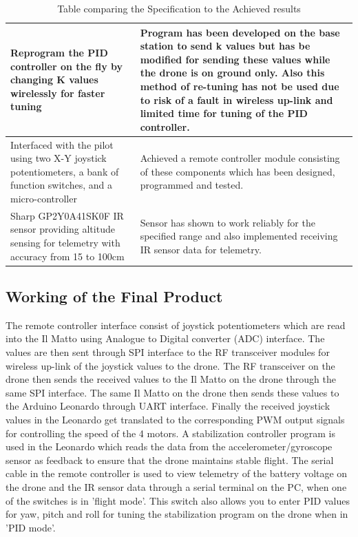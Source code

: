 \documentclass[a4paper,11pt]{article}
\begin{document}
\begin{center}
\begin{table}[!htp]
\begin{tabular}{|m{5cm}|m{8cm}|}
    \hline
    Reprogram the PID controller on the fly by changing K values wirelessly for faster tuning & Program has been developed on the base station to send k values but has be modified for sending these values while the drone is on ground only. Also this method of re-tuning has not be used due to risk of a fault in wireless up-link and limited time for tuning of the PID controller.\\
    \hline
    Interfaced with the pilot using two X-Y joystick potentiometers, a bank of function switches, and a micro-controller & Achieved a remote controller module consisting of these components which has been designed, programmed and tested.\\
    \hline 
    Sharp GP2Y0A41SK0F IR sensor providing altitude sensing for telemetry with accuracy from 15 to 100cm & Sensor has shown to work reliably for the specified range and also implemented receiving IR sensor data for telemetry.\\
    \hline
    \end{tabular}
    \caption{Table comparing the Specification to the Achieved results}
  \end{table}
\end{center}
\FloatBarrier

\newpage
\subsection{Working of the Final Product}
The remote controller interface consist of joystick potentiometers which are read into the Il Matto using Analogue to Digital converter (ADC) interface. The values are then sent through SPI interface to the RF transceiver modules for wireless up-link of the joystick values to the drone. The RF transceiver on the drone then sends the received values to the Il Matto on the drone through the same SPI interface. The same Il Matto on the drone then sends these values to the Arduino Leonardo through UART interface. Finally the received joystick values in the Leonardo get translated to the corresponding PWM output signals for controlling the speed of the 4 motors. A stabilization controller program is used in the Leonardo which reads the data from the accelerometer/gyroscope sensor as feedback to ensure that the drone maintains stable flight. 
The serial cable in the remote controller is used to view telemetry of the battery voltage on the drone and the IR sensor data through a serial terminal on the PC, when one of the switches is in 'flight mode'. This switch also allows you to enter PID values for yaw, pitch and roll for tuning the stabilization program on the drone when in 'PID mode'.
\end{document}
